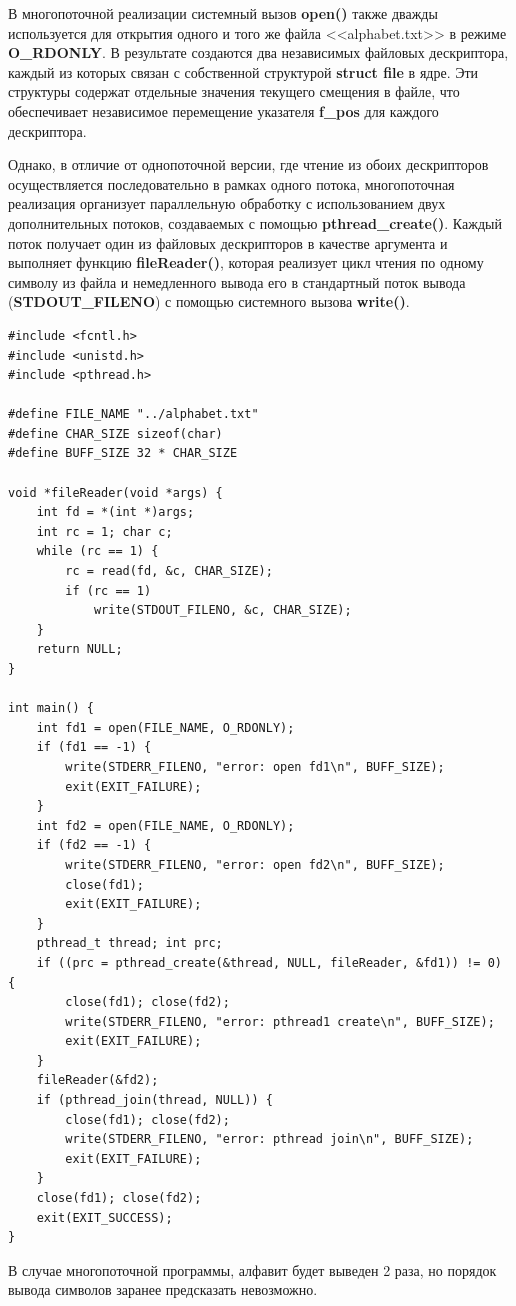 В многопоточной реализации системный вызов \textbf{open()} также дважды используется для открытия одного и того же файла <<alphabet.txt>> в режиме \textbf{O\_RDONLY}. В результате создаются два независимых файловых дескриптора, каждый из которых связан с собственной структурой \textbf{struct file} в ядре. Эти структуры содержат отдельные значения текущего смещения в файле, что обеспечивает независимое перемещение указателя \textbf{f\_pos} для каждого дескриптора.

Однако, в отличие от однопоточной версии, где чтение из обоих дескрипторов осуществляется последовательно в рамках одного потока, многопоточная реализация организует параллельную обработку с использованием двух дополнительных потоков, создаваемых с помощью \textbf{pthread\_create()}. Каждый поток получает один из файловых дескрипторов в качестве аргумента и выполняет функцию \textbf{fileReader()}, которая реализует цикл чтения по одному символу из файла и немедленного вывода его в стандартный поток вывода (\textbf{STDOUT\_FILENO}) с помощью системного вызова \textbf{write()}.

\begin{lstlisting}[caption=Многопоточная программа c одним дополнительным потоком,label=lst:FILEstruct111211]
#include <fcntl.h>
#include <unistd.h>
#include <pthread.h>

#define FILE_NAME "../alphabet.txt"
#define CHAR_SIZE sizeof(char)
#define BUFF_SIZE 32 * CHAR_SIZE

void *fileReader(void *args) {
	int fd = *(int *)args;
	int rc = 1; char c;
	while (rc == 1) {
		rc = read(fd, &c, CHAR_SIZE);
		if (rc == 1)
			write(STDOUT_FILENO, &c, CHAR_SIZE);
	}
	return NULL;
}

int main() {
	int fd1 = open(FILE_NAME, O_RDONLY);
	if (fd1 == -1) {
		write(STDERR_FILENO, "error: open fd1\n", BUFF_SIZE);
		exit(EXIT_FAILURE);
	}
	int fd2 = open(FILE_NAME, O_RDONLY);
	if (fd2 == -1) {
		write(STDERR_FILENO, "error: open fd2\n", BUFF_SIZE);
		close(fd1);
		exit(EXIT_FAILURE);
	}
	pthread_t thread; int prc;
	if ((prc = pthread_create(&thread, NULL, fileReader, &fd1)) != 0) {
		close(fd1); close(fd2);
		write(STDERR_FILENO, "error: pthread1 create\n", BUFF_SIZE);
		exit(EXIT_FAILURE);
	}
	fileReader(&fd2);
	if (pthread_join(thread, NULL)) {
		close(fd1); close(fd2);
		write(STDERR_FILENO, "error: pthread join\n", BUFF_SIZE);
		exit(EXIT_FAILURE);
	}
	close(fd1); close(fd2);
	exit(EXIT_SUCCESS);
}
\end{lstlisting}

В случае многопоточной программы, алфавит будет выведен 2 раза, но порядок вывода символов заранее предсказать невозможно.

